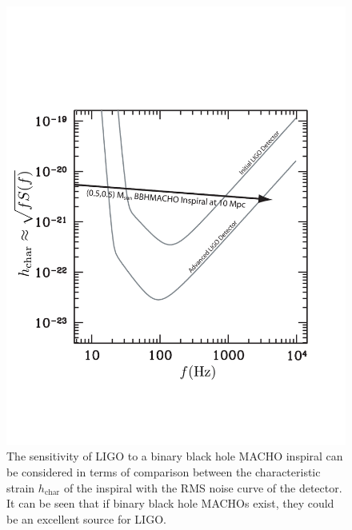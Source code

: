 \begin{figure}[p]
\begin{center}
\includegraphics[width=\linewidth]{figures/macho/noisecurves}
\end{center}
\caption[Sensitivity of LIGO to a Binary Black Hole MACHO Inspiral]{%
\label{f:machosensitivity}
The sensitivity of LIGO to a binary black hole MACHO inspiral can be
considered in terms of comparison between the characteristic strain
$h_\mathrm{char}$ of the inspiral with the RMS noise curve of the detector. It
can be seen that if binary black hole MACHOs exist, they could be an excellent
source for LIGO.
}
\end{figure}

